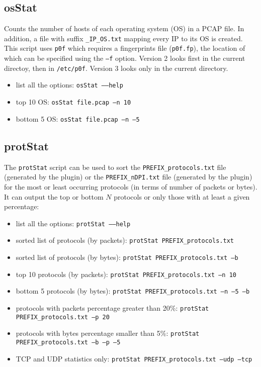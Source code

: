 \documentclass[documentation]{subfiles}
\begin{document}
\subsection{osStat}
Counts the number of hosts of each operating system (OS) in a PCAP file.
In addition, a file with suffix {\tt \_IP\_OS.txt} mapping every IP to its OS is created.
This script uses {\tt p0f} which requires a fingerprints file ({\tt p0f.fp}), the location of which can be specified using the {\tt --f} option.
Version 2 looks first in the current directoy, then in {\tt /etc/p0f}.
Version 3 looks only in the current directory.
\begin{itemize}
    \item list all the options: {\tt osStat --{}--help}
    \item top 10 OS: {\tt osStat file.pcap --n 10}
    \item bottom 5 OS: {\tt osStat file.pcap --n --5}
\end{itemize}


\subsection{protStat}\label{protStat}
The {\tt protStat} script can be used to sort the {\tt PREFIX\_protocols.txt} file (generated by the  plugin) or the {\tt PREFIX\_nDPI.txt} file (generated by the  plugin) for the most or least occurring protocols (in terms of number of packets or bytes).
It can output the top or bottom $N$ protocols or only those with at least a given percentage:
\begin{itemize}
    \item list all the options: {\tt protStat --{}--help}
    \item sorted list of protocols (by packets): {\tt protStat PREFIX\_protocols.txt}
    \item sorted list of protocols (by bytes): {\tt protStat PREFIX\_protocols.txt --b}
    \item top 10 protocols (by packets): {\tt protStat PREFIX\_protocols.txt --n 10}
    \item bottom 5 protocols (by bytes): {\tt protStat PREFIX\_protocols.txt --n --5 --b}
    \item protocols with packets percentage greater than 20\%: {\tt protStat PREFIX\_protocols.txt --p 20}
    \item protocols with bytes percentage smaller than 5\%: {\tt protStat PREFIX\_protocols.txt --b --p --5}
    \item TCP and UDP statistics only: {\tt protStat PREFIX\_protocols.txt --udp --tcp}
\end{itemize}
\end{document}
